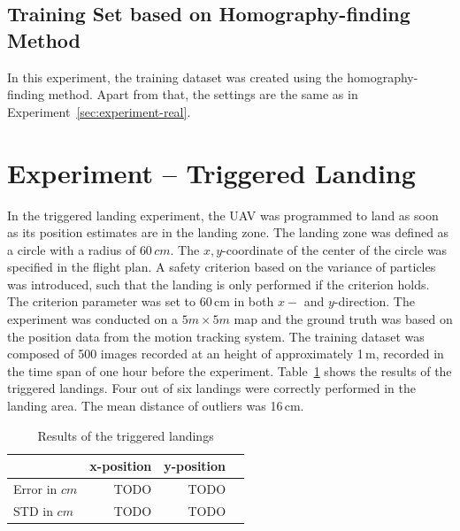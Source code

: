 \documentclass{report}
\begin{document}

\subsection{Training Set based on Homography-finding Method}
\label{sec:traininghomo}

In this experiment, the training dataset was created using the
homography-finding method. Apart from that, the settings are the same
as in Experiment~\ref{sec:experiment-real}.

\section{Experiment -- Triggered Landing}
\label{sec:triggered}

In the triggered landing experiment, the UAV was programmed to land as
soon as its position estimates are in the landing zone. The landing
zone was defined as a circle with a radius of $60\,cm$. The
$x,y$-coordinate of the center of the circle was specified in the
flight plan. A safety criterion based on the variance of particles was
introduced, such that the landing is only performed if the criterion
holds. The criterion parameter was set to 60\,cm in both $x-$ and
$y$-direction. The experiment was conducted on a $5m \times 5m$ map
and the ground truth was based on the position data from the motion
tracking system. The training dataset was composed of 500 images
recorded at an height of approximately 1\,m, recorded in the time span
of one hour before the experiment. Table~\ref{tab:targetlanding} shows the results of the triggered
landings. Four out of six landings were correctly performed in the
landing area. The mean distance of outliers was 16\,cm.
\begin{table}[H]
  \centering
  \begin{tabular}{lrrr}
    \toprule
    & x-position & y-position\\
    \midrule
    Error in $cm$ & TODO & TODO\\
    STD in $cm$ & TODO & TODO\\
    \bottomrule
  \end{tabular}
  \caption[Triggered landings]{Results of the triggered landings}
  \label{tab:targetlanding}

\end{table}
\end{document}
